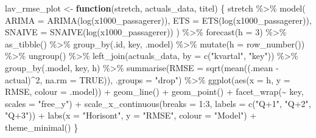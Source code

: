\documentclass[
  danish,
]{article}
\newenvironment{Shaded}{\begin{snugshade}}{\end{snugshade}}
\newcommand{\AttributeTok}[1]{\textcolor[rgb]{0.40,0.45,0.13}{#1}}
\newcommand{\ConstantTok}[1]{\textcolor[rgb]{0.56,0.35,0.01}{#1}}
\newcommand{\ControlFlowTok}[1]{\textcolor[rgb]{0.00,0.23,0.31}{\textbf{#1}}}
\newcommand{\DecValTok}[1]{\textcolor[rgb]{0.68,0.00,0.00}{#1}}
\newcommand{\FunctionTok}[1]{\textcolor[rgb]{0.28,0.35,0.67}{#1}}
\newcommand{\NormalTok}[1]{\textcolor[rgb]{0.00,0.23,0.31}{#1}}
\newcommand{\OtherTok}[1]{\textcolor[rgb]{0.00,0.23,0.31}{#1}}
\newcommand{\SpecialCharTok}[1]{\textcolor[rgb]{0.37,0.37,0.37}{#1}}
\newcommand{\StringTok}[1]{\textcolor[rgb]{0.13,0.47,0.30}{#1}}
\begin{document}
\begin{Shaded}
\begin{Highlighting}[]
\NormalTok{lav\_rmse\_plot }\OtherTok{\textless{}{-}} \ControlFlowTok{function}\NormalTok{(stretch, actuals\_data, titel) \{}
\NormalTok{  stretch }\SpecialCharTok{\%\textgreater{}\%}
    \FunctionTok{model}\NormalTok{(}
      \AttributeTok{ARIMA  =} \FunctionTok{ARIMA}\NormalTok{(}\FunctionTok{log}\NormalTok{(x1000\_passagerer)),}
      \AttributeTok{ETS    =} \FunctionTok{ETS}\NormalTok{(}\FunctionTok{log}\NormalTok{(x1000\_passagerer)),}
      \AttributeTok{SNAIVE =} \FunctionTok{SNAIVE}\NormalTok{(}\FunctionTok{log}\NormalTok{(x1000\_passagerer))}
\NormalTok{    ) }\SpecialCharTok{\%\textgreater{}\%}
    \FunctionTok{forecast}\NormalTok{(}\AttributeTok{h =} \DecValTok{3}\NormalTok{) }\SpecialCharTok{\%\textgreater{}\%}
    \FunctionTok{as\_tibble}\NormalTok{() }\SpecialCharTok{\%\textgreater{}\%}
    \FunctionTok{group\_by}\NormalTok{(.id, key, .model) }\SpecialCharTok{\%\textgreater{}\%}
    \FunctionTok{mutate}\NormalTok{(}\AttributeTok{h =} \FunctionTok{row\_number}\NormalTok{()) }\SpecialCharTok{\%\textgreater{}\%}
    \FunctionTok{ungroup}\NormalTok{() }\SpecialCharTok{\%\textgreater{}\%}
    \FunctionTok{left\_join}\NormalTok{(actuals\_data, }\AttributeTok{by =} \FunctionTok{c}\NormalTok{(}\StringTok{"kvartal"}\NormalTok{, }\StringTok{"key"}\NormalTok{)) }\SpecialCharTok{\%\textgreater{}\%}
    \FunctionTok{group\_by}\NormalTok{(.model, key, h) }\SpecialCharTok{\%\textgreater{}\%}
    \FunctionTok{summarise}\NormalTok{(}\AttributeTok{RMSE =} \FunctionTok{sqrt}\NormalTok{(}\FunctionTok{mean}\NormalTok{((.mean }\SpecialCharTok{{-}}\NormalTok{ actual)}\SpecialCharTok{\^{}}\DecValTok{2}\NormalTok{, }\AttributeTok{na.rm =} \ConstantTok{TRUE}\NormalTok{)),}
              \AttributeTok{.groups =} \StringTok{"drop"}\NormalTok{) }\SpecialCharTok{\%\textgreater{}\%}
    \FunctionTok{ggplot}\NormalTok{(}\FunctionTok{aes}\NormalTok{(}\AttributeTok{x =}\NormalTok{ h, }\AttributeTok{y =}\NormalTok{ RMSE, }\AttributeTok{colour =}\NormalTok{ .model)) }\SpecialCharTok{+}
    \FunctionTok{geom\_line}\NormalTok{() }\SpecialCharTok{+}
    \FunctionTok{geom\_point}\NormalTok{() }\SpecialCharTok{+}
    \FunctionTok{facet\_wrap}\NormalTok{(}\SpecialCharTok{\textasciitilde{}}\NormalTok{ key, }\AttributeTok{scales =} \StringTok{"free\_y"}\NormalTok{) }\SpecialCharTok{+}
    \FunctionTok{scale\_x\_continuous}\NormalTok{(}\AttributeTok{breaks =} \DecValTok{1}\SpecialCharTok{:}\DecValTok{3}\NormalTok{,}
                       \AttributeTok{labels =} \FunctionTok{c}\NormalTok{(}\StringTok{"Q+1"}\NormalTok{, }\StringTok{"Q+2"}\NormalTok{, }\StringTok{"Q+3"}\NormalTok{)) }\SpecialCharTok{+}
    \FunctionTok{labs}\NormalTok{(}\AttributeTok{x =} \StringTok{"Horisont"}\NormalTok{,}
         \AttributeTok{y =} \StringTok{"RMSE"}\NormalTok{,}
         \AttributeTok{colour =} \StringTok{"Model"}\NormalTok{) }\SpecialCharTok{+}
    \FunctionTok{theme\_minimal}\NormalTok{()}
\NormalTok{\}}


\end{Highlighting}
\end{Shaded}
\end{document}
